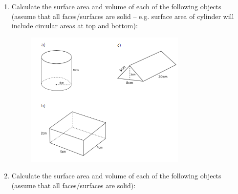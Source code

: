 \begin{enumerate}[noitemsep, label=\textbf{\arabic*}. ]
\begin{figure}[H]
\begin{center}
      \vspace{2pt}
    \vspace{.1in}
    
    \end{center}

 \end{figure}   

    \addtocounter{footnote}{-0}
            \label{m39358*uid1217}\item Calculate the surface area and volume of each of the following objects (assume that all faces/surfaces are solid -- e.g. surface area of cylinder will include circular areas at top and bottom):

    \setcounter{subfigure}{0}


	\begin{figure}[H] %
    \begin{center}
    \label{m39358*id320601!!!underscore!!!media}\label{m39358*id320601!!!underscore!!!printimage}\includegraphics[width=300px]{col11306.imgs/m39358_MG10C14_042.png} %
        
      \vspace{2pt}
    \vspace{.1in}
    
    \end{center}

 \end{figure}   

    \addtocounter{footnote}{-0}
            \label{m39358*uid1218}\item Calculate the surface area and volume of each of the following objects (assume that all faces/surfaces are solid):

    \setcounter{subfigure}{0}



\end{enumerate}
